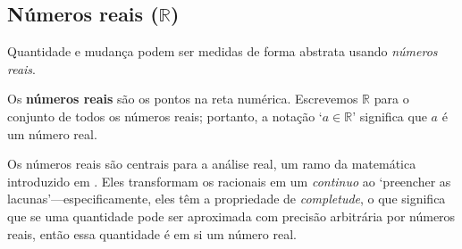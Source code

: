 \subsection*{Números reais ($\mathbb{R}$)}

Quantidade e mudança podem ser medidas de forma abstrata usando \textit{números reais}.

\begin{definition}
\label{defRealsInformal}
Os \textbf{números reais} são os pontos na reta numérica. Escrevemos $\mathbb{R}$  para o conjunto de todos os números reais; portanto, a notação `$a \in \mathbb{R}$' significa que $a$ é um número real.

\end{definition}

Os números reais são centrais para a análise real, um ramo da matemática introduzido em . Eles transformam os racionais em um \textit{continuo} ao `preencher as lacunas'---especificamente, eles têm a propriedade de \textit{completude}, o que significa que se uma quantidade pode ser aproximada com precisão arbitrária por números reais, então essa quantidade é em si um número real.

